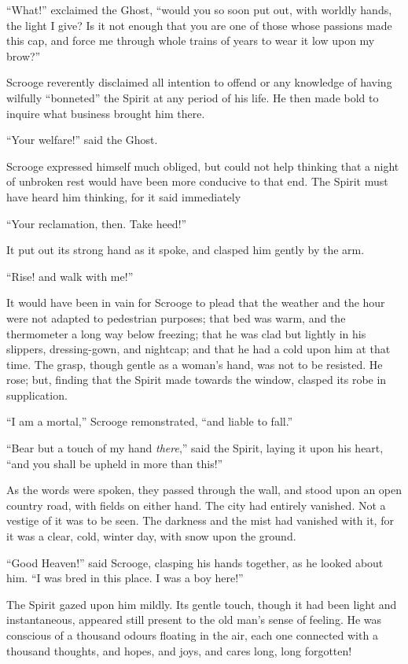 \documentclass[paper=5.5in:8.5in,BCOR=7mm,twoside,DIV=calc,12pt,usegeometry]{scrbook} %
\begin{document}
\enquote{What!} exclaimed the Ghost, \enquote{would you so soon put out, with worldly hands, the light I give? Is it not enough that you are one of those whose passions made this cap, and force me through whole trains of years to wear it low upon my brow?}

Scrooge reverently disclaimed all intention to offend or any knowledge of having wilfully \enquote{bonneted} the Spirit at any period of his life. He then made bold to inquire what business brought him there.

\enquote{Your welfare!} said the Ghost.

Scrooge expressed himself much obliged, but could not help thinking that a night of unbroken rest would have been more conducive to that end. The Spirit must have heard him thinking, for it said immediately\textemdash 

\enquote{Your reclamation, then. Take heed!}

It put out its strong hand as it spoke, and clasped him gently by the arm.

\enquote{Rise! and walk with me!}

It would have been in vain for Scrooge to plead that the weather and the hour were not adapted to pedestrian purposes; that bed was warm, and the thermometer a long way below freezing; that he was clad but lightly in his slippers, dressing-gown, and nightcap; and that he had a cold upon him at that time. The grasp, though gentle as a woman's hand, was not to be resisted. He rose; but, finding that the Spirit made towards the window, clasped its robe in supplication.

\enquote{I am a mortal,} Scrooge remonstrated, \enquote{and liable to fall.}

\enquote{Bear but a touch of my hand \textit{there},} said the Spirit, laying it upon his heart, \enquote{and you shall be upheld in more than this!}

As the words were spoken, they passed through the wall, and stood upon an open country road, with fields on either hand. The city had entirely vanished. Not a vestige of it was to be seen. The darkness and the mist had vanished with it, for it was a clear, cold, winter day, with snow upon the ground.

\enquote{Good Heaven!} said Scrooge, clasping his hands together, as he looked about him. \enquote{I was bred in this place. I was a boy here!}

The Spirit gazed upon him mildly. Its gentle touch, though it had been light and instantaneous, appeared still present to the old man's sense of feeling. He was conscious of a thousand odours floating in the air, each one connected with a thousand thoughts, and hopes, and joys, and cares long, long forgotten!
\end{document}
